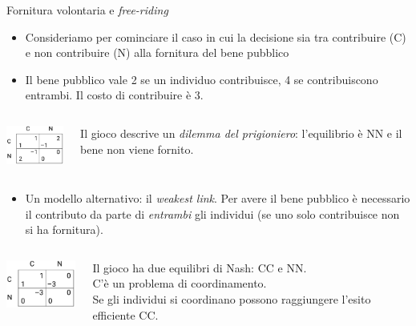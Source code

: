 \documentclass[aspectratio=149,11pt]{beamer}
\begin{document}
\begin{frame}{Fornitura volontaria e \emph{free-riding}}
\begin{itemize}
\item Consideriamo per cominciare il caso in cui la decisione sia tra contribuire (C) e non contribuire (N) alla fornitura del bene pubblico
\item Il bene pubblico vale 2 se un individuo contribuisce, 4 se contribuiscono entrambi. Il costo di contribuire è 3.
\end{itemize}
\vspace{-6pt}
\begin{columns}
\begin{column}{.4\columnwidth}
\begin{center}
\includegraphics[width=2.5cm]{./figure/gioco-bene-pubblico-dilemma-prigioniero.png}
\end{center}
\vspace{0pt}
\end{column}
\begin{column}{.6\columnwidth}
  Il gioco descrive un \emph{dilemma del prigioniero}: l'equilibrio è NN e il bene non viene fornito.
\end{column}
\end{columns}
\begin{itemize}
\item Un modello alternativo: il \emph{weakest link}.  Per avere il bene pubblico è necessario il contributo da parte di \emph{entrambi} gli individui (se uno solo contribuisce non si ha fornitura).
\end{itemize}
\vspace{-6pt}
\begin{columns}
\begin{column}{.4\columnwidth}
\begin{center}
\includegraphics[width=2.5cm]{./figure/gioco-bene-pubblico-coordinamento.png}
\end{center}
\smallskip
\end{column}
\begin{column}{.6\columnwidth}
  Il gioco ha due equilibri di Nash: CC e NN.\\[0pt]
  C'è un problema di coordinamento.\\[0pt]
  Se gli individui si coordinano possono raggiungere l'esito efficiente CC.
\end{column}
\end{columns}
\end{frame}
\end{document}
